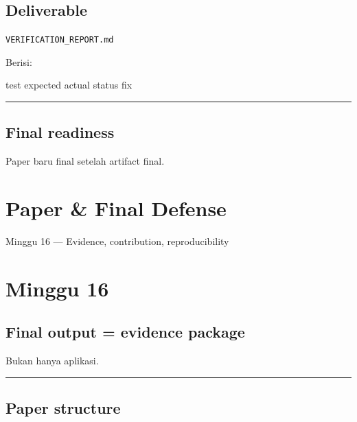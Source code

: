 \documentclass[
  indonesian,
  letterpaper,
  DIV=11,
  numbers=noendperiod]{scrreprt}
\newenvironment{Shaded}{\begin{snugshade}}{\end{snugshade}}
\newcommand{\NormalTok}[1]{\textcolor[rgb]{0.00,0.23,0.31}{#1}}
\begin{document}
\section{Deliverable}\label{deliverable-8}

\texttt{VERIFICATION\_REPORT.md}

Berisi:

\begin{Shaded}
\begin{Highlighting}[]
\NormalTok{test}
\NormalTok{expected}
\NormalTok{actual}
\NormalTok{status}
\NormalTok{fix}
\end{Highlighting}
\end{Shaded}

\begin{center}\rule{0.5\linewidth}{0.5pt}\end{center}

\section{Final readiness}\label{final-readiness}

Paper baru final setelah artifact final.

\chapter{Paper \& Final Defense}\label{paper-final-defense}

Minggu 16 --- Evidence, contribution, reproducibility

\hfill\break

\chapter{Minggu 16}\label{minggu-16}

\section{Final output = evidence
package}\label{final-output-evidence-package}

Bukan hanya aplikasi.

\begin{center}\rule{0.5\linewidth}{0.5pt}\end{center}

\section{Paper structure}\label{paper-structure}
\end{document}
